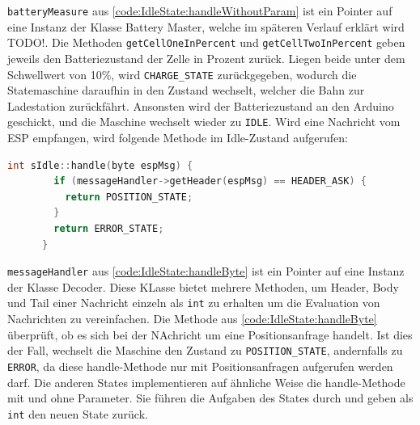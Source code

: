	\vspace{0.5cm}
\texttt{batteryMeasure} aus \autoref{code:IdleState:handleWithoutParam} ist ein Pointer auf eine Instanz der Klasse Battery Master, welche im späteren Verlauf erklärt wird TODO!. 
Die Methoden \texttt{getCellOneInPercent} und \texttt{getCellTwoInPercent} geben jeweils den Batteriezustand der Zelle in Prozent zurück. Liegen beide unter dem Schwellwert von 10\%, wird \texttt{CHARGE\_STATE} zurückgegeben, wodurch die Statemaschine daraufhin in den Zustand wechselt, welcher die Bahn zur Ladestation zurückfährt.
Ansonsten wird der Batteriezustand an den Arduino geschickt, und die Maschine wechselt wieder zu \texttt{IDLE}.
Wird eine Nachricht vom ESP empfangen, wird folgende Methode im Idle-Zustand aufgerufen: 
\vspace{0.5cm}
\begin{lstlisting}[language=c, style=dhpaperdefault]
	int sIdle::handle(byte espMsg) {
		if (messageHandler->getHeader(espMsg) == HEADER_ASK) {
		  return POSITION_STATE;
		}
		return ERROR_STATE;
	  }
\end{lstlisting}
\vspace{0.5cm}

\texttt{messageHandler} aus \autoref{code:IdleState:handleByte} ist ein Pointer auf eine Instanz der Klasse Decoder. Diese KLasse bietet mehrere Methoden, um Header, Body und Tail einer Nachricht einzeln als \texttt{int} zu erhalten um die Evaluation von Nachrichten zu vereinfachen.
Die Methode aus \autoref{code:IdleState:handleByte} überprüft, ob es sich bei der NAchricht um eine Positionsanfrage handelt. Ist dies der Fall, wechselt die Maschine den Zustand zu \texttt{POSITION\_STATE}, andernfalls zu \texttt{ERROR}, da diese handle-Methode nur mit Positionsanfragen aufgerufen werden darf.
Die anderen States implementieren auf ähnliche Weise die handle-Methode mit und ohne Parameter. Sie führen die Aufgaben des States durch und geben als \texttt{int} den neuen State zurück. 


